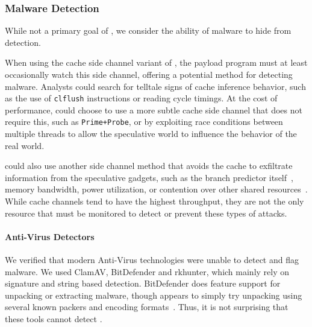 \subsubsection{Malware Detection}
\label{subsubsec:malware}
While not a primary goal of \speculake, we consider the ability of \speculake
malware to hide from detection.

When using the cache side channel variant of \speculake, the payload program
must at least occasionally watch this side channel, offering a potential method
for detecting \speculake malware. Analysts could search for telltale signs of
cache inference behavior, such as the use of \texttt{clflush} instructions or
reading cycle timings. At the cost of performance, \speculake could choose to
use a more subtle cache side channel that does not require this, such as
\texttt{Prime+Probe}, or by exploiting race conditions between multiple threads
to allow the speculative world to influence the behavior of the real world.

\speculake could also use another side channel method that avoids the cache to
exfiltrate information from the speculative gadgets, such as the branch
predictor itself~\cite{evtyushkin2018branchscope}, memory bandwidth, power
utilization, or contention over other shared
resources~\cite{kiriansky2018speculative}. While cache channels tend to have the
highest throughput, they are not the only resource that must be monitored to
detect or prevent these types of attacks. 

\paragraph{Anti-Virus Detectors}
We verified that modern Anti-Virus technologies were unable to detect
and flag \speculake malware. We used ClamAV, BitDefender and rkhunter, which
mainly rely on signature and string based detection. BitDefender does feature
support for unpacking or extracting malware, though appears to simply try
unpacking using several known packers and encoding formats~\cite{BitDefender}.
Thus, it is not surprising that these tools cannot detect
\speculake.


